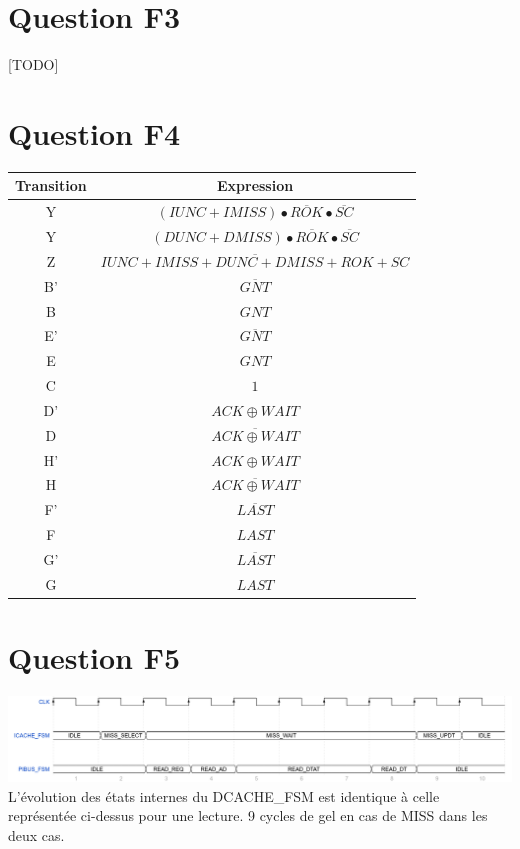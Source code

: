 \documentclass[10pt]{article}
\begin{document}
\section{Question F3}
[TODO]

\section{Question F4}
\begin{tabular}{|c|c|}
  \hline
  {\bf Transition} & {\bf Expression} \\ \hline
  Y & $({IUNC}+{IMISS})\bullet\overline{ROK}\bullet\overline{SC}$ \\ \hline
  Y & $({DUNC}+{DMISS})\bullet\overline{ROK}\bullet\overline{SC}$ \\ \hline
  Z & $\overline{{IUNC}+{IMISS}+{DUNC}+{DMISS}+{ROK}+{SC}}$ \\ \hline
  B' & $\overline{GNT}$ \\ \hline
  B & ${GNT}$ \\ \hline
  E' & $\overline{GNT}$ \\ \hline
  E & ${GNT}$ \\ \hline
  C & $1$ \\ \hline
  D' & ${{ACK}\oplus{WAIT}}$ \\ \hline
  D & $\overline{{ACK}\oplus{WAIT}}$ \\ \hline
  H' & ${{ACK}\oplus{WAIT}}$ \\ \hline
  H & $\overline{{ACK}\oplus{WAIT}}$ \\ \hline
  F' & $\overline{LAST}$ \\ \hline
  F & ${LAST}$ \\ \hline
  G' & $\overline{LAST}$ \\ \hline
  G & ${LAST}$ \\ \hline
\end{tabular}

\section{Question F5}
\includegraphics[width=18cm]{icache_wave.png}\\
L'évolution des états internes du DCACHE\_FSM est identique à celle représentée
ci-dessus pour une lecture. 9 cycles de gel en cas de MISS dans les deux cas.
\end{document}
